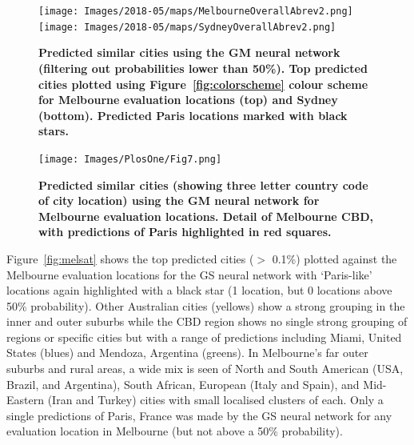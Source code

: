 \documentclass[Crown,sageh,times]{sagej}
\begin{document}



\begin{figure}[!htbp]
\centering   
\texttt{[image: Images/2018-05/maps/MelbourneOverallAbrev2.png]} 
\texttt{[image: Images/2018-05/maps/SydneyOverallAbrev2.png]}  
\caption{  \bf Predicted similar cities using the GM neural network (filtering out probabilities lower than 50\%). Top predicted cities plotted using Figure~\ref{fig:colorscheme} colour scheme for Melbourne evaluation locations (top) and Sydney (bottom). Predicted Paris locations marked with black stars.}    
 \label{fig:melmaps}  
\end{figure} 


\begin{figure}[!htbp]
\centering     
\texttt{[image: Images/PlosOne/Fig7.png]} 
\caption{\bf Predicted similar cities (showing three letter country code of city location) using the GM neural network for Melbourne evaluation locations. Detail of Melbourne CBD, with predictions of Paris highlighted in red squares.}    
 \label{fig:melmapscbd}  
\end{figure} 


Figure~\ref{fig:melsat} shows the top predicted cities ($>$ 0.1\%) plotted against the Melbourne evaluation locations for the GS neural network with `Paris-like' locations again highlighted with a black star (1 location, but 0 locations above 50\% probability). Other Australian cities (yellows) show a strong grouping in the inner and outer suburbs while the CBD region shows no single strong grouping of regions or specific cities but with a range of predictions including Miami, United States (blues) and Mendoza, Argentina (greens). In Melbourne's far outer suburbs and rural areas, a wide mix is seen of North and South American (USA, Brazil, and Argentina), South African, European (Italy and Spain), and Mid-Eastern (Iran and Turkey) cities with small localised clusters of each. Only a single predictions of Paris, France was made by the GS neural network for any evaluation location in Melbourne (but not above a 50\% probability).
\end{document}
